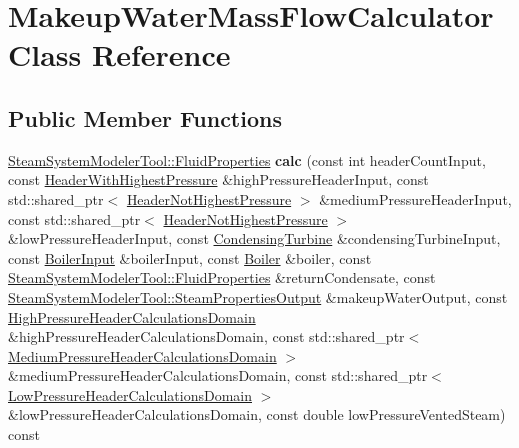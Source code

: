 \hypertarget{class_makeup_water_mass_flow_calculator}{}\section{Makeup\+Water\+Mass\+Flow\+Calculator Class Reference}
\label{class_makeup_water_mass_flow_calculator}
\subsection*{Public Member Functions}
\begin{DoxyCompactItemize}
\item 
\mbox{\label{class_makeup_water_mass_flow_calculator_a66bad96c1e50b0d45a5f67bc21d87662}} 
\hyperlink{struct_steam_system_modeler_tool_1_1_fluid_properties}{Steam\+System\+Modeler\+Tool\+::\+Fluid\+Properties} {\bfseries calc} (const int header\+Count\+Input, const \hyperlink{class_header_with_highest_pressure}{Header\+With\+Highest\+Pressure} \&high\+Pressure\+Header\+Input, const std\+::shared\+\_\+ptr$<$ \hyperlink{class_header_not_highest_pressure}{Header\+Not\+Highest\+Pressure} $>$ \&medium\+Pressure\+Header\+Input, const std\+::shared\+\_\+ptr$<$ \hyperlink{class_header_not_highest_pressure}{Header\+Not\+Highest\+Pressure} $>$ \&low\+Pressure\+Header\+Input, const \hyperlink{class_condensing_turbine}{Condensing\+Turbine} \&condensing\+Turbine\+Input, const \hyperlink{class_boiler_input}{Boiler\+Input} \&boiler\+Input, const \hyperlink{class_boiler}{Boiler} \&boiler, const \hyperlink{struct_steam_system_modeler_tool_1_1_fluid_properties}{Steam\+System\+Modeler\+Tool\+::\+Fluid\+Properties} \&return\+Condensate, const \hyperlink{struct_steam_system_modeler_tool_1_1_steam_properties_output}{Steam\+System\+Modeler\+Tool\+::\+Steam\+Properties\+Output} \&makeup\+Water\+Output, const \hyperlink{class_high_pressure_header_calculations_domain}{High\+Pressure\+Header\+Calculations\+Domain} \&high\+Pressure\+Header\+Calculations\+Domain, const std\+::shared\+\_\+ptr$<$ \hyperlink{class_medium_pressure_header_calculations_domain}{Medium\+Pressure\+Header\+Calculations\+Domain} $>$ \&medium\+Pressure\+Header\+Calculations\+Domain, const std\+::shared\+\_\+ptr$<$ \hyperlink{class_low_pressure_header_calculations_domain}{Low\+Pressure\+Header\+Calculations\+Domain} $>$ \&low\+Pressure\+Header\+Calculations\+Domain, const double low\+Pressure\+Vented\+Steam) const
\item 

\end{DoxyCompactItemize}
